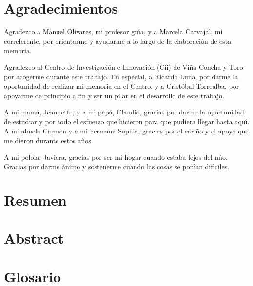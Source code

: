 \section*{Agradecimientos}
Agradezco a Manuel Olivares, mi profesor gu\'{\i}a, y a Marcela Carvajal, mi correferente, por orientarme y ayudarme a lo largo de la elaboraci\'{o}n de esta memoria.

Agradezco al Centro de Investigaci\'{o}n e Innovaci\'{o}n (Cii) de Vi\~{n}a Concha y Toro por acogerme durante este trabajo. En especial, a Ricardo Luna, por darme la oportunidad de realizar mi memoria en el Centro, y a Crist\'{o}bal Torrealba, por apoyarme de principio a fin y ser un pilar en el desarrollo de este trabajo.

A mi mam\'{a}, Jeannette, y a mi pap\'{a}, Claudio, gracias por darme la oportunidad de estudiar y por todo el esfuerzo que hicieron para que pudiera llegar hasta aqu\'{\i}. A mi abuela Carmen y a mi hermana Sophia, gracias por el cari\~{n}o y el apoyo que me dieron durante estos a\~{n}os.

A mi polola, Javiera, gracias por ser mi hogar cuando estaba lejos del m\'{\i}o. Gracias por darme \'{a}nimo y sostenerme cuando las cosas se pon\'{\i}an dif\'{\i}ciles.
\newpage

\section*{Resumen}
 
\newpage

\section*{Abstract}

\newpage

\section*{Glosario}


